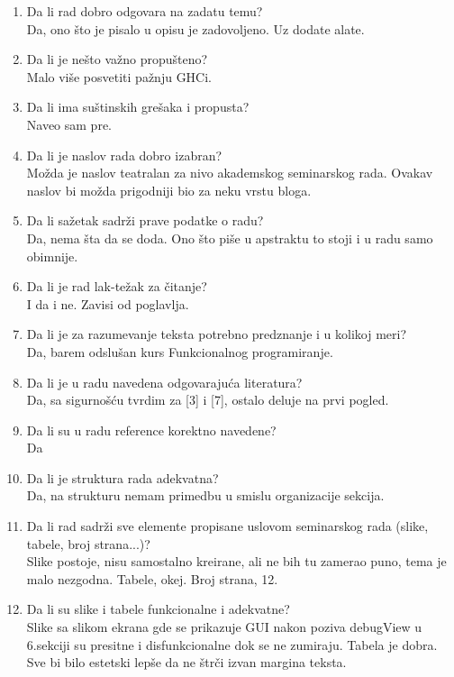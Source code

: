 \documentclass[a4paper]{report}
\begin{document}
\begin{enumerate}
\item Da li rad dobro odgovara na zadatu temu?\\
Da, ono što je pisalo u opisu je zadovoljeno. Uz dodate alate.
\item Da li je nešto važno propušteno?\\
Malo više posvetiti pažnju GHCi.
\item Da li ima suštinskih grešaka i propusta?\\
Naveo sam pre.
\item Da li je naslov rada dobro izabran?\\
Možda je naslov teatralan za nivo akademskog seminarskog rada.
Ovakav naslov bi možda prigodniji bio za neku vrstu bloga.
\item Da li sažetak sadrži prave podatke o radu?\\
Da, nema šta da se doda. Ono što piše u apstraktu to stoji i u radu samo obimnije.
\item Da li je rad lak-težak za čitanje?\\
I da i ne. Zavisi od poglavlja. 
\item Da li je za razumevanje teksta potrebno predznanje i u kolikoj meri?\\
Da, barem odslušan kurs Funkcionalnog programiranje.
\item Da li je u radu navedena odgovarajuća literatura?\\
Da, sa sigurnošću tvrdim za [3] i [7], ostalo deluje na prvi pogled.
\item Da li su u radu reference korektno navedene?\\
Da
\item Da li je struktura rada adekvatna?\\
Da, na strukturu nemam primedbu u smislu organizacije sekcija.
\item Da li rad sadrži sve elemente propisane uslovom seminarskog rada (slike, tabele, broj strana...)?\\
Slike postoje, nisu samostalno kreirane, ali ne bih tu zamerao puno, tema je malo nezgodna.
Tabele, okej.
Broj strana, 12.
\item Da li su slike i tabele funkcionalne i adekvatne?\\
Slike sa slikom ekrana gde se prikazuje GUI nakon poziva debugView u 6.sekciji su presitne i disfunkcionalne dok
se ne zumiraju. 
Tabela je dobra.
Sve bi bilo estetski lepše da ne štrči izvan margina teksta.
\end{enumerate}
\end{document}
